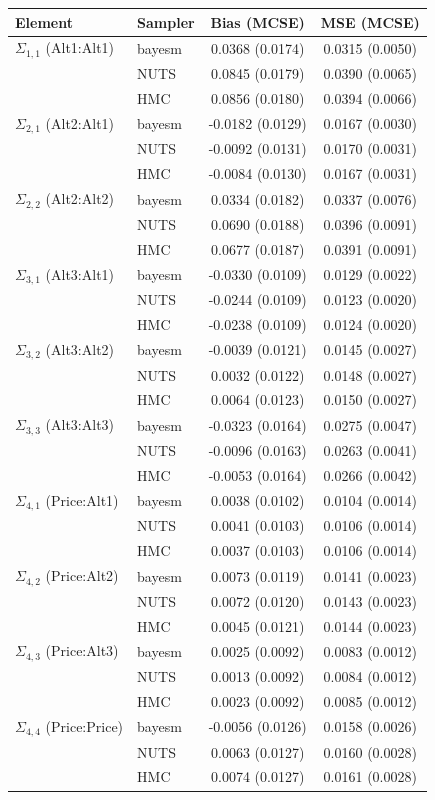 \begin{tabular}{llcc}
\toprule
Element & Sampler & Bias (MCSE) & MSE (MCSE) \\
\midrule
$\Sigma_{1,1}$ (Alt1:Alt1) & bayesm & 0.0368 (0.0174) & 0.0315 (0.0050) \\
 & NUTS & 0.0845 (0.0179) & 0.0390 (0.0065) \\
 & HMC & 0.0856 (0.0180) & 0.0394 (0.0066) \\
$\Sigma_{2,1}$ (Alt2:Alt1) & bayesm & -0.0182 (0.0129) & 0.0167 (0.0030) \\
 & NUTS & -0.0092 (0.0131) & 0.0170 (0.0031) \\
 & HMC & -0.0084 (0.0130) & 0.0167 (0.0031) \\
$\Sigma_{2,2}$ (Alt2:Alt2) & bayesm & 0.0334 (0.0182) & 0.0337 (0.0076) \\
 & NUTS & 0.0690 (0.0188) & 0.0396 (0.0091) \\
 & HMC & 0.0677 (0.0187) & 0.0391 (0.0091) \\
$\Sigma_{3,1}$ (Alt3:Alt1) & bayesm & -0.0330 (0.0109) & 0.0129 (0.0022) \\
 & NUTS & -0.0244 (0.0109) & 0.0123 (0.0020) \\
 & HMC & -0.0238 (0.0109) & 0.0124 (0.0020) \\
$\Sigma_{3,2}$ (Alt3:Alt2) & bayesm & -0.0039 (0.0121) & 0.0145 (0.0027) \\
 & NUTS & 0.0032 (0.0122) & 0.0148 (0.0027) \\
 & HMC & 0.0064 (0.0123) & 0.0150 (0.0027) \\
$\Sigma_{3,3}$ (Alt3:Alt3) & bayesm & -0.0323 (0.0164) & 0.0275 (0.0047) \\
 & NUTS & -0.0096 (0.0163) & 0.0263 (0.0041) \\
 & HMC & -0.0053 (0.0164) & 0.0266 (0.0042) \\
$\Sigma_{4,1}$ (Price:Alt1) & bayesm & 0.0038 (0.0102) & 0.0104 (0.0014) \\
 & NUTS & 0.0041 (0.0103) & 0.0106 (0.0014) \\
 & HMC & 0.0037 (0.0103) & 0.0106 (0.0014) \\
$\Sigma_{4,2}$ (Price:Alt2) & bayesm & 0.0073 (0.0119) & 0.0141 (0.0023) \\
 & NUTS & 0.0072 (0.0120) & 0.0143 (0.0023) \\
 & HMC & 0.0045 (0.0121) & 0.0144 (0.0023) \\
$\Sigma_{4,3}$ (Price:Alt3) & bayesm & 0.0025 (0.0092) & 0.0083 (0.0012) \\
 & NUTS & 0.0013 (0.0092) & 0.0084 (0.0012) \\
 & HMC & 0.0023 (0.0092) & 0.0085 (0.0012) \\
$\Sigma_{4,4}$ (Price:Price) & bayesm & -0.0056 (0.0126) & 0.0158 (0.0026) \\
 & NUTS & 0.0063 (0.0127) & 0.0160 (0.0028) \\
 & HMC & 0.0074 (0.0127) & 0.0161 (0.0028) \\
\bottomrule
\end{tabular}
